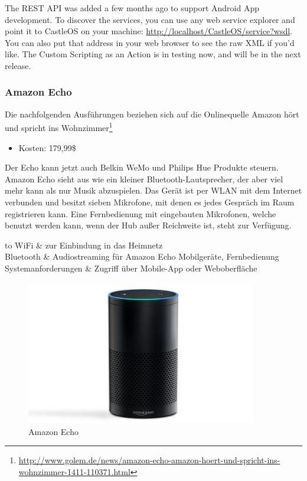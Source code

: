 \glqq The REST API was added a few months ago to support Android App development. To discover the services, you can use any web service explorer and point it to CastleOS on your machine: \url{http://localhost/CastleOS/service?wsdl}. You can also put that address in your web browser to see the raw XML if you'd like. The Custom Scripting as an Action is in testing now, and will be in the next release.\grqq

\subsubsection{Amazon Echo}
Die nachfolgenden Ausführungen beziehen sich auf die Onlinequelle \glqq Amazon hört und spricht ins Wohnzimmer\grqq\footnote{\url{http://www.golem.de/news/amazon-echo-amazon-hoert-und-spricht-ins-wohnzimmer-1411-110371.html}}

\begin{itemize}
\item Kosten: 179,99\$
\end{itemize}

\noindent
Der Echo kann jetzt auch Belkin WeMo und Philips Hue Produkte steuern. Amazon Echo sieht aus wie ein kleiner Bluetooth-Lautsprecher, der aber viel mehr kann als nur Musik abzuspielen. Das Gerät ist per WLAN mit dem Internet verbunden und besitzt sieben Mikrofone, mit denen es jedes Gespräch im Raum registrieren kann. Eine Fernbedienung mit eingebauten Mikrofonen, welche benutzt werden kann, wenn der Hub außer Reichweite ist, steht zur Verfügung.

\begin{longtabu} to 
		\hline
		WiFi	
		& zur Einbindung in das Heimnetz \\
		\hline 
	 	Bluetooth
		& Audiostreaming für Amazon Echo Mobilgeräte, Fernbedienung \\
		\hline 
	 	Systemanforderungen
		& Zugriff über Mobile-App oder Weboberfläche \\
		\hline
	\caption{Spezifikation: Amazon Echo}
\end{longtabu}

\begin{figure}[h!]
	\centering
	\includegraphics[width=0.9\textwidth]{img/Feedback-Mechanismen/AmazonEcho.png}
	\caption{Amazon Echo}
	\label{fig:feedbackAmazonEcho}
\end{figure}

